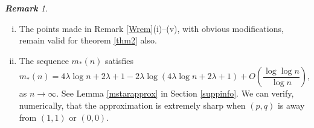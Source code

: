 \documentclass[reqno]{amsart}
\def\blue{\color{blue}}
\theoremstyle{theorem}
\theoremstyle{definition}
\theoremstyle{remark}
\newtheorem{remark}[theorem]{\bf\em Remark}
\newcommand{\1}{{\text{\Large $\mathfrak 1$}}}	%
\numberwithin{equation}{section}
\newcommand{\tkmid}[2]{\begin{center}\begin{minipage}{#1} \color{red} \fbox{\small \tt #2} \end{minipage}\end{center}}
\begin{document}

\begin{remark}
\begin{enumerate}[(i)]
\item
The points made in Remark \ref{Wrem}(i)--(v), with obvious
modifications, remain valid for theorem \ref{thm2} also.
\item
The sequence $m_*(n)$ satisfies
\[
m_*(n) = 4\lambda \log n+2\lambda+1
-2\lambda \log(4\lambda \log n+2\lambda+1) 
+ O\left(\frac{\log\log n}{\log n}\right),
\]
as $n \to \infty$.
See Lemma \ref{mstarapprox} in Section \ref{suppinfo}.
We can verify, numerically, that the approximation is extremely sharp
when $(p,q)$ is away from $(1,1)$ or $(0,0)$.
\end{enumerate}
\end{remark}
\end{document}

